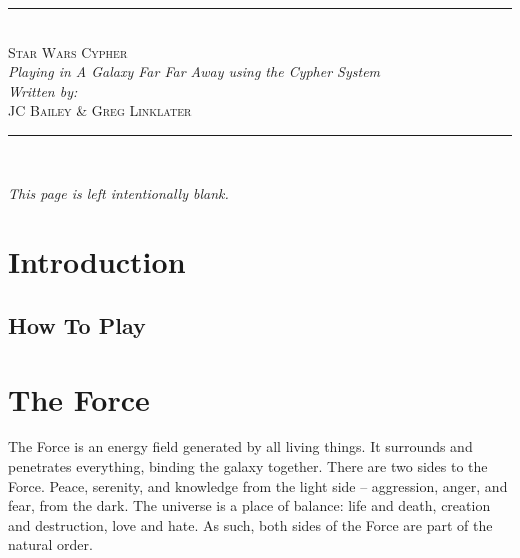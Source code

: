 \documentclass[a4paper,10pt,final,twocolumn,oneside]{book}
\newcommand{\DocTitle}{Star Wars Cypher}
\newcommand{\DocSubtitle}{Playing in A Galaxy Far Far Away using the Cypher System}
\newcommand{\DocAuthors}{JC Bailey \& Greg Linklater}
\newcommand{\HRule}{\rule{\linewidth}{0.5mm}} %
\renewcommand\frontmatter{
  \pagenumbering{Roman}
}
\renewcommand\mainmatter{
  \pagenumbering{arabic}
}
\begin{document}
\frontmatter

\begin{titlepage}
\center
\vspace*{\fill}
\HRule \\[4mm]

{ \huge \textsc{\DocTitle} }\\ %
{ \small \textit{\DocSubtitle} }\\[3mm]

\emph{Written by:}\\
{\small \textsc{\DocAuthors}} \\%

\HRule \\[3mm]
\vspace*{\fill}
\end{titlepage}

\thispagestyle{plain}
\setcounter{page}{2}
\begin{figure*}
\centering
\vspace*{\fill}
\textit{This page is left intentionally blank.}
\vspace*{\fill}
\end{figure*}

\tableofcontents
\mainmatter


\chapter{Introduction} %
\label{cha:introduction}

\section{How To Play} %
\label{sec:how_to_play}



\clearpage

\chapter{The Force} %
\label{cha:force}

The Force is an energy field generated by all living things. It surrounds and penetrates everything, binding the galaxy together. There are two sides to the Force. Peace, serenity, and knowledge from the light side -- aggression, anger, and fear, from the dark. The universe is a place of balance: life and death, creation and destruction, love and hate. As such, both sides of the Force are part of the natural order.
\end{document}
